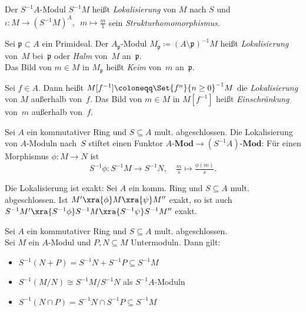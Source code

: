 \documentclass{cheat-sheet}
\newcommand{\Mod}{\mathbf{Mod}} %
\newcommand{\LMod}[1]{{#1}\text{-}\Mod} %
\newcommand{\ppp}{\mathfrak{p}}
\begin{document}
\begin{defn}
  Der $S^{-1} A$-Modul $S^{-1} M$ heißt \emph{Lokalisierung} von $M$ nach $S$ und $\iota : M \to (S^{-1} M)^A, \enspace m \mapsto \tfrac{m}{1}$ sein \textit{Strukturhomomorphismus}.
\end{defn}

\begin{defn}
  Sei $\ppp \subset A$ ein Primideal.
  Der $A_\ppp$-Modul $M_\ppp \coloneqq (A \setminus \ppp)^{-1} M$ heißt \textit{Lokalisierung} von~$M$ bei~$\ppp$ oder \textit{Halm} von~$M$ an~$\ppp$. \\
  Das Bild von $m \in M$ in $M_\ppp$ heißt \emph{Keim} von~$m$ an~$\ppp$.
\end{defn}

\begin{defn}
  Sei $f \in A$.
  Dann heißt $M[f^{-1}] \coloneqq \Set{f^n}{n \geq 0}^{-1} M$ die \textit{Lokalisierung} von $M$ außerhalb von~$f$.
  Das Bild von $m \in M$ in $M[f^{-1}]$ heißt \textit{Einschränkung} von~$m$ außerhalb von~$f$.
\end{defn}


\begin{bem}
  Sei $A$ ein kommutativer Ring und $S \subseteq A$ mult. abgeschlossen.
  Die Lokalisierung von $A$-Moduln nach~$S$ stiftet einen Funktor $\LMod{A} \to \LMod{(S^{-1} A)}$:
  Für einen Morphismus $\phi : M \to N$ ist
  \[
    S^{-1} \phi : S^{-1} M \to S^{-1} N, \quad
    \tfrac{m}{s} \mapsto \tfrac{\phi(m)}{s}.
  \]
\end{bem}

\begin{prop}
  Die Lokalisierung ist exakt:
  Sei $A$ ein komm. Ring und $S \subseteq A$ mult. abgeschlossen.
  Ist $M' \xra{\phi} M \xra{\psi} M''$ exakt, so ist auch $S^{-1} M' \xra{S^{-1} \phi} S^{-1} M \xra{S^{-1} \psi} S^{-1} M''$ exakt.
\end{prop}

\begin{prop}
  Sei $A$ ein kommutativer Ring und $S \subseteq A$ mult. abgeschlossen. \\
  Sei $M$ ein $A$-Modul und $P, N \subseteq M$ Untermoduln.
  Dann gilt:
  \begin{itemize}
    \item $S^{-1} (N + P) = S^{-1} N + S^{-1} P \subseteq S^{-1} M$
    \item $S^{-1} (M / N) \cong S^{-1} M / S^{-1} N$ als $S^{-1} A$-Moduln
    \item $S^{-1} (N \cap P) = S^{-1} N \cap S^{-1} P \subseteq S^{-1} M$
  \end{itemize}
\end{prop}
\end{document}
